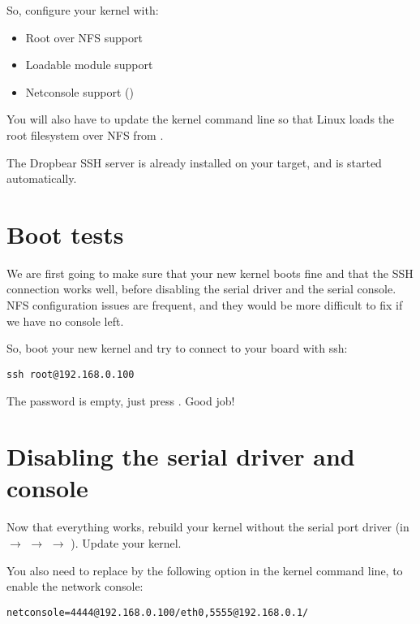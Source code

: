 So, configure your kernel with:
\begin{itemize}
\item Root over NFS support
\item Loadable module support
\item Netconsole support ()
\end{itemize}

You will also have to update the kernel command line so that Linux
loads the root filesystem over NFS from
.

The Dropbear SSH server is already installed on your target, and is
started automatically.

\section{Boot tests}

We are first going to make sure that your new kernel boots fine and
that the SSH connection works well, before disabling the serial driver
and the serial console. NFS configuration issues are frequent, and
they would be more difficult to fix if we have no console left.

So, boot your new kernel and try to connect to your board with ssh:

\begin{verbatim}
ssh root@192.168.0.100
\end{verbatim}

The  password is empty, just press . Good job!

\section{Disabling the serial driver and console}

Now that everything works, rebuild your kernel without the serial port
driver (in  $\rightarrow$ 
$\rightarrow$  $\rightarrow$ ). Update your kernel.

You also need to replace  by the following option in
the kernel command line, to enable the network console:

\begin{verbatim}
netconsole=4444@192.168.0.100/eth0,5555@192.168.0.1/
\end{verbatim}

